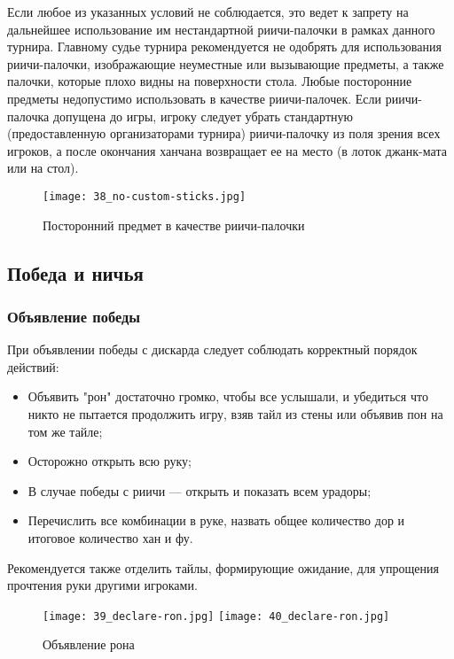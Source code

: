 Если любое из указанных условий не соблюдается, это ведет к запрету на дальнейшее использование им нестандартной риичи-палочки в рамках данного турнира. Главному судье турнира рекомендуется не одобрять для использования риичи-палочки, изображающие неуместные или вызывающие предметы, а также палочки, которые плохо видны на поверхности стола. Любые посторонние предметы недопустимо использовать в качестве риичи-палочек. Если риичи-палочка допущена до игры, игроку следует убрать стандартную (предоставленную организаторами турнира) риичи-палочку из поля зрения всех игроков, а после окончания ханчана возвращает ее на место (в лоток джанк-мата или на стол).

\begin{figure}[H]
	\centering
	\texttt{[image: 38\_no-custom-sticks.jpg]}
	\caption{Посторонний предмет в качестве риичи-палочки}
\end{figure}

\subsection{Победа и ничья}

\subsubsection{Объявление победы}

При объявлении победы с дискарда следует соблюдать корректный порядок действий:

\begin{itemize}
	\item Объявить "рон" достаточно громко, чтобы все услышали, и убедиться что никто не пытается продолжить игру, взяв тайл из стены или объявив пон на том же тайле;
	\item Осторожно открыть всю руку;
	\item В случае победы с риичи --- открыть и показать всем урадоры;
	\item Перечислить все комбинации в руке, назвать общее количество дор и итоговое количество хан и фу.
\end{itemize}

\newpage

Рекомендуется также отделить тайлы, формирующие ожидание, для упрощения прочтения руки другими игроками.

\begin{figure}[H]
	\centering
	\texttt{[image: 39\_declare-ron.jpg]}
	\texttt{[image: 40\_declare-ron.jpg]}
	\caption{Объявление рона}
\end{figure}

